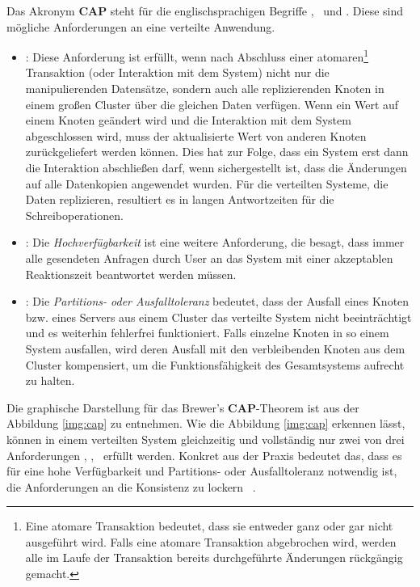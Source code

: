 Das Akronym \textbf{CAP} steht für die englischsprachigen Begriffe  \Cap, \cAp\ und \caP. Diese sind mögliche Anforderungen an eine verteilte Anwendung.
\begin{itemize}
\item \Cap: Diese Anforderung ist erfüllt, wenn nach Abschluss einer atomaren\footnote{Eine atomare Transaktion bedeutet, dass sie entweder ganz oder gar nicht ausgeführt wird. Falls eine atomare Transaktion abgebrochen wird, werden alle im Laufe der Transaktion bereits durchgeführte Änderungen rückgängig gemacht.} Transaktion (oder Interaktion mit dem System) nicht nur die manipulierenden Datensätze, sondern auch alle replizierenden Knoten in einem großen Cluster über die gleichen Daten verfügen. Wenn ein Wert auf einem Knoten geändert wird und die Interaktion mit dem System abgeschlossen wird, muss der aktualisierte Wert von anderen Knoten zurückgeliefert werden können. Dies hat zur Folge, dass ein System erst dann die Interaktion abschließen darf, wenn sichergestellt ist, dass die Änderungen auf alle Datenkopien angewendet wurden. Für die verteilten Systeme, die Daten replizieren, resultiert es in langen Antwortzeiten für die Schreiboperationen.

\item \cAp: Die \textit{Hochverfügbarkeit} ist eine weitere Anforderung, die besagt, dass immer alle gesendeten Anfragen durch User an das System mit einer akzeptablen Reaktionszeit beantwortet werden müssen.

\item \caP: Die \textit{Partitions- oder Ausfalltoleranz} bedeutet, dass der Ausfall eines Knoten bzw. eines Servers aus einem Cluster das verteilte System nicht beeinträchtigt und es weiterhin fehlerfrei funktioniert. Falls einzelne Knoten in so einem System ausfallen, wird deren Ausfall mit den verbleibenden Knoten aus dem Cluster kompensiert, um die Funktionsfähigkeit des Gesamtsystems aufrecht zu halten.

\end{itemize}

Die graphische Darstellung für das Brewer's \textbf{CAP}-Theorem ist aus der Abbildung \ref{img:cap} zu entnehmen. Wie die Abbildung \ref{img:cap} erkennen lässt, können in einem verteilten System gleichzeitig und vollständig nur zwei von drei Anforderungen  \Cap, \cAp, \caP\ erfüllt werden. Konkret aus der Praxis bedeutet das, dass es für eine hohe Verfügbarkeit und Partitions- oder Ausfalltoleranz notwendig ist, die Anforderungen an die Konsistenz zu lockern ~\cite[S. 31]{Edlich.2011}.

